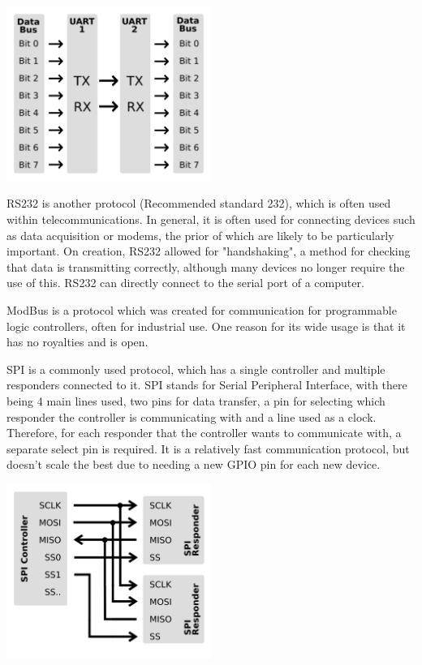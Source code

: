 \documentclass[a4paper,11pt]{report}
\begin{document}
\includegraphics[width=0.5\textwidth]{UART}

RS232 is another protocol (Recommended standard 232), which is often used within telecommunications. In general, it is often used for connecting devices such as data acquisition or modems, the prior of which are likely to be particularly important. On creation, RS232 allowed for "handshaking", a method for checking that data is transmitting correctly, although many devices no longer require the use of this. RS232 can directly connect to the serial port of a computer.

ModBus is a protocol which was created for communication for programmable logic controllers, often for industrial use. One reason for its wide usage is that it has no royalties and is open.

SPI is a commonly used protocol, which has a single controller and multiple responders connected to it. SPI stands for Serial Peripheral Interface, with there being 4 main lines used, two pins for data transfer, a pin for selecting which responder the controller is communicating with and a line used as a clock. Therefore, for each responder that the controller wants to communicate with, a separate select pin is required. It is a relatively fast communication protocol, but doesn't scale the best due to needing a new GPIO pin for each new device.

\includegraphics[width=0.5\textwidth]{SPI}
\end{document}
